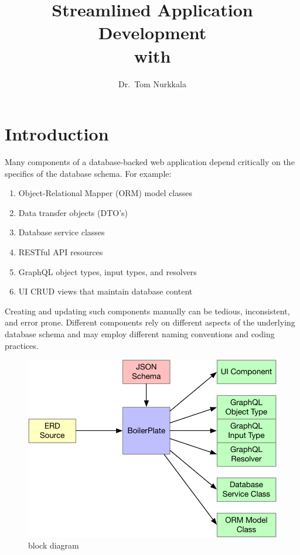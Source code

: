 \documentclass{article}
\title{Streamlined Application Development\\with \boil}
\author{Dr.\ Tom Nurkkala}
\begin{document}
\maketitle
\tableofcontents

\section{Introduction}
\label{sec:introduction}

Many components of a database-backed web application
depend critically
on the specifics of the database schema.
For example:
\begin{enumerate}
\item Object-Relational Mapper (ORM) model classes
\item Data transfer objects (DTO's)
\item Database service classes
\item RESTful API resources
\item GraphQL object types, input types, and resolvers
\item UI CRUD views that maintain database content
\end{enumerate}
Creating
and updating
such components manually
can be tedious, inconsistent, and error prone.
Different components
rely on different aspects
of the underlying database schema
and may employ different naming conventions and
coding practices.

\begin{figure}[h]
  \centering
  \includegraphics[width=\textwidth]{block-diagram}
  \caption{\boil{} block diagram}
  \label{fig:block-diagram}
\end{figure}
\end{document}
